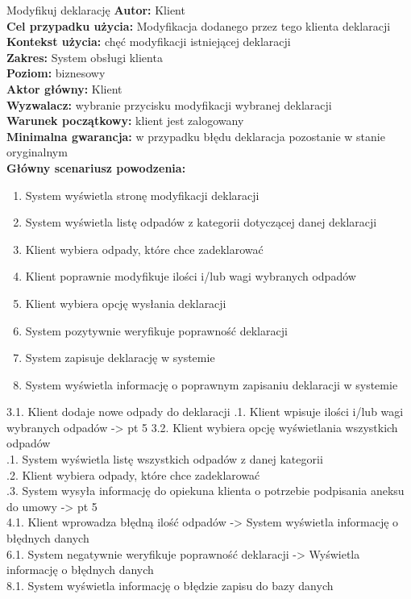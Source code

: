 \begin{usecase}{Modyfikuj deklarację}
	\textbf{Autor:} Klient\\
	\textbf{Cel przypadku użycia:} Modyfikacja dodanego przez tego klienta deklaracji \\
	\textbf{Kontekst użycia:} chęć modyfikacji istniejącej deklaracji\\
	\textbf{Zakres:} System obsługi klienta \\
	\textbf{Poziom:} biznesowy \\
	\textbf{Aktor główny:} Klient\\
	\textbf{Wyzwalacz:} wybranie przycisku modyfikacji wybranej deklaracji \\
	\textbf{Warunek początkowy:} klient jest zalogowany\\
	\textbf{Minimalna gwarancja:} w przypadku błędu deklaracja pozostanie w stanie oryginalnym \\
	\textbf{Główny scenariusz powodzenia:} \\
		\begin{enumerate}
			\item System wyświetla stronę modyfikacji deklaracji
			\item System wyświetla listę odpadów z kategorii dotyczącej danej deklaracji
			\item Klient wybiera odpady, które chce zadeklarować
			\item Klient poprawnie modyfikuje ilości i/lub wagi wybranych odpadów
			\item Klient wybiera opcję wysłania deklaracji
			\item System pozytywnie weryfikuje poprawność deklaracji
			\item System zapisuje deklarację w systemie
			\item System wyświetla informację o poprawnym zapisaniu deklaracji w systemie
		\end{enumerate}
			3.1. Klient dodaje nowe odpady do deklaracji
				.1. Klient wpisuje ilości i/lub wagi wybranych odpadów -> pt 5
			3.2. Klient wybiera opcję wyświetlania wszystkich odpadów \\
				.1. System wyświetla listę wszystkich odpadów z danej kategorii \\
				.2. Klient wybiera odpady, które chce zadeklarować \\
				.3. System wysyła informację do opiekuna klienta o potrzebie podpisania aneksu do umowy -> pt 5 \\
			4.1. Klient wprowadza błędną ilość odpadów -> System wyświetla informację o błędnych danych \\
			6.1. System negatywnie weryfikuje poprawność deklaracji -> Wyświetla informację o błędnych danych \\
			8.1. System wyświetla informację o błędzie zapisu do bazy danych \\
\end{usecase}


